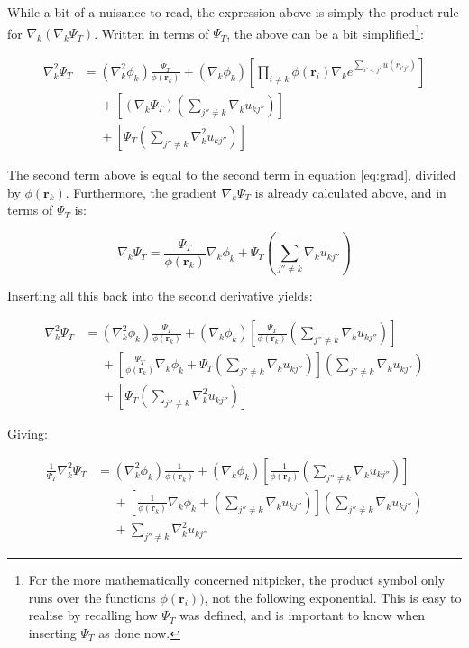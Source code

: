 \documentclass[english, a4paper]{article}
\newcommand{\bm}[1]{\mathbf{#1}}
\begin{document}
While a bit of a nuisance to read, the expression above is simply the product rule for $\nabla_k(\nabla_k\Psi_T)$. Written in terms of $\Psi_T$, the above can be a bit simplified\footnote{For the more mathematically concerned nitpicker, the product symbol only runs over the functions $\phi(\bm{r}_i))$, not the following exponential. This is easy to realise by recalling how $\Psi_T$ was defined, and is important to know when inserting $\Psi_T$ as done now.}:

\begin{align*}
	\nabla_k^2\Psi_T &= (\nabla_k^2\phi_k)\frac{\Psi_T}{\phi(\bm{r}_k)} + (\nabla_k\phi_k) \left[\prod_{i\neq k}\phi(\bm{r}_i)\nabla_ke^{\sum_{i'<j'}u(r_{i'j'})}\right]\\
	&\:\:\:\:\:\: + \left[\left(\nabla_k\Psi_T\right)\left(\sum_{j''\neq k}\nabla_ku_{kj''} \right)\right]\\
	&\:\:\:\:\:\: + \left[\Psi_T\left(\sum_{j''\neq k}\nabla_k^2u_{kj''} \right)\right]
\end{align*}

The second term above is equal to the second term in equation \ref{eq:grad}, divided by $\phi(\bm{r}_k)$. Furthermore, the gradient $\nabla_k\Psi_T$ is already calculated above, and in terms of $\Psi_T$ is:

\begin{equation}
	\nabla_k\Psi_T = \frac{\Psi_T}{\phi(\bm{r}_k)}\nabla_k\phi_k + \Psi_T\left(\sum_{j''\neq k}\nabla_ku_{kj''} \right)
\end{equation}

Inserting all this back into the second derivative yields:

\begin{align*}
	\nabla_k^2\Psi_T &= (\nabla_k^2\phi_k)\frac{\Psi_T}{\phi(\bm{r}_k)} + (\nabla_k\phi_k) \left[\frac{\Psi_T}{\phi(\bm{r}_k)}\left(\sum_{j''\neq k}\nabla_ku_{kj''} \right)\right]\\
	&\:\:\:\:\:\: + \left[\frac{\Psi_T}{\phi(\bm{r}_k)}\nabla_k\phi_k + \Psi_T\left(\sum_{j''\neq k}\nabla_ku_{kj''} \right)\right]\left(\sum_{j''\neq k}\nabla_ku_{kj''} \right)\\
	&\:\:\:\:\:\: + \left[\Psi_T\left(\sum_{j''\neq k}\nabla_k^2u_{kj''} \right)\right]
\end{align*}

Giving:

\begin{align*}
	\frac{1}{\Psi_T}\nabla_k^2\Psi_T &= (\nabla_k^2\phi_k)\frac{1}{\phi(\bm{r}_k)} + (\nabla_k\phi_k) \left[\frac{1}{\phi(\bm{r}_k)}\left(\sum_{j''\neq k}\nabla_ku_{kj''} \right)\right]\\
	&\:\:\:\:\:\: + \left[\frac{1}{\phi(\bm{r}_k)}\nabla_k\phi_k + \left(\sum_{j''\neq k}\nabla_ku_{kj''} \right)\right]\left(\sum_{j''\neq k}\nabla_ku_{kj''} \right)\\
	&\:\:\:\:\:\: + \sum_{j''\neq k}\nabla_k^2u_{kj''}
\end{align*}
\end{document}
